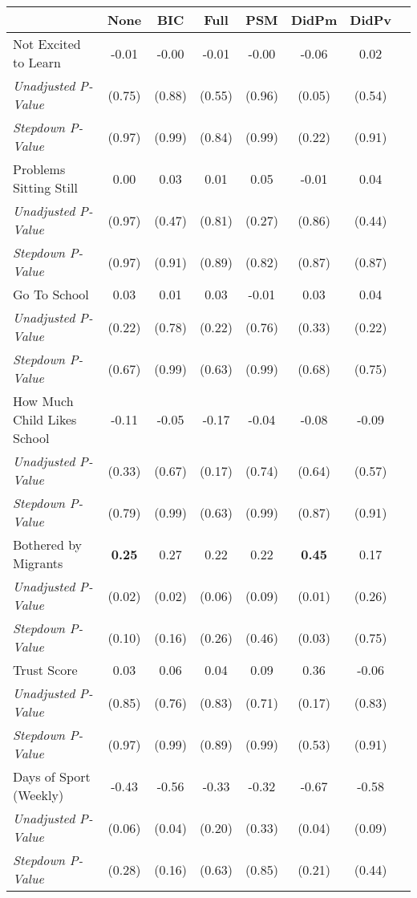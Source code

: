 \begin{tabular}{l c c c c c c c}
\toprule
 & None & BIC & Full & PSM & DidPm & DidPv \\
\midrule
Not Excited to Learn & -0.01 & -0.00 & -0.01 & -0.00 & -0.06 & 0.02 \\
\quad \textit{Unadjusted P-Value} & (0.75) & (0.88) & (0.55) & (0.96) & (0.05) & (0.54) \\
\quad \textit{Stepdown P-Value} & (0.97) & (0.99) & (0.84) & (0.99) & (0.22) & (0.91) \\
Problems Sitting Still & 0.00 & 0.03 & 0.01 & 0.05 & -0.01 & 0.04 \\
\quad \textit{Unadjusted P-Value} & (0.97) & (0.47) & (0.81) & (0.27) & (0.86) & (0.44) \\
\quad \textit{Stepdown P-Value} & (0.97) & (0.91) & (0.89) & (0.82) & (0.87) & (0.87) \\
Go To School & 0.03 & 0.01 & 0.03 & -0.01 & 0.03 & 0.04 \\
\quad \textit{Unadjusted P-Value} & (0.22) & (0.78) & (0.22) & (0.76) & (0.33) & (0.22) \\
\quad \textit{Stepdown P-Value} & (0.67) & (0.99) & (0.63) & (0.99) & (0.68) & (0.75) \\
How Much Child Likes School & -0.11 & -0.05 & -0.17 & -0.04 & -0.08 & -0.09 \\
\quad \textit{Unadjusted P-Value} & (0.33) & (0.67) & (0.17) & (0.74) & (0.64) & (0.57) \\
\quad \textit{Stepdown P-Value} & (0.79) & (0.99) & (0.63) & (0.99) & (0.87) & (0.91) \\
Bothered by Migrants & \textbf{ 0.25 } & 0.27 & 0.22 & 0.22 & \textbf{ 0.45 } & 0.17 \\
\quad \textit{Unadjusted P-Value} & (0.02) & (0.02) & (0.06) & (0.09) & (0.01) & (0.26) \\
\quad \textit{Stepdown P-Value} & (0.10) & (0.16) & (0.26) & (0.46) & (0.03) & (0.75) \\
Trust Score & 0.03 & 0.06 & 0.04 & 0.09 & 0.36 & -0.06 \\
\quad \textit{Unadjusted P-Value} & (0.85) & (0.76) & (0.83) & (0.71) & (0.17) & (0.83) \\
\quad \textit{Stepdown P-Value} & (0.97) & (0.99) & (0.89) & (0.99) & (0.53) & (0.91) \\
Days of Sport (Weekly) & -0.43 & -0.56 & -0.33 & -0.32 & -0.67 & -0.58 \\
\quad \textit{Unadjusted P-Value} & (0.06) & (0.04) & (0.20) & (0.33) & (0.04) & (0.09) \\
\quad \textit{Stepdown P-Value} & (0.28) & (0.16) & (0.63) & (0.85) & (0.21) & (0.44) \\
\bottomrule
\end{tabular}
